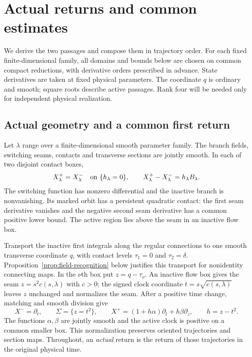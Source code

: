 \section{Actual returns and common estimates}
\label{sec:passage}

We derive the two passages and compose them in trajectory order. For each
fixed finite-dimensional family, all domains and bounds below are chosen
on common compact reductions, with derivative orders prescribed in advance.
State derivatives are taken at fixed physical parameters. The coordinate
$q$ is ordinary and smooth; square roots describe active passages. Rank four
will be needed only for independent physical realization.

\subsection{Actual geometry and a common first return}
\label{subsec:observed-controls}

Let $\lambda$ range over a finite-dimensional smooth parameter family.
The branch fields, switching seams, contacts and transverse sections
are jointly smooth. In each of two disjoint contact boxes,
\begin{equation}\label{eq:matched}
 X^+_\lambda=X^-_\lambda\quad\hbox{on }\{h_\lambda=0\},
 \qquad X^+_\lambda-X^-_\lambda=h_\lambda B_\lambda.
\end{equation}
The switching function has nonzero differential and the inactive branch
is nonvanishing. Its marked orbit has a persistent quadratic contact:
the first seam derivative vanishes and the negative second seam
derivative has a common positive lower bound. The active region lies
above the seam in an inactive flow box.

Transport the inactive first integrals along the regular connections to
one smooth transverse coordinate $q$, with contact levels $\tau_1=0$
and $\tau_2=\delta$. Proposition~\ref{prop:field-recognition} below
justifies this transport for nonidentity connecting maps. In the
$\nu$th box put $z=q-\tau_\nu$. An inactive flow box gives the seam
$z=s^2c(s,\lambda)$ with $c>0$; the signed clock coordinate
$t=s\sqrt{c(s,\lambda)}$ leaves $z$ unchanged and normalizes the seam.
After a positive time change, matching and smooth division give
\begin{equation}\label{eq:passage:local-geometry}
 X^-=\partial_t,\qquad \Sigma=\{z=t^2\},\qquad
 X^+=(1+h\alpha)\partial_t+h\beta\partial_z,
 \qquad h=z-t^2.
\end{equation}
The functions $\alpha,\beta$ are jointly smooth and the active clock is
positive on a common smaller box. This normalization preserves oriented
trajectories and section maps. Throughout, an \emph{actual} return is
the return of those trajectories in the original physical time.

